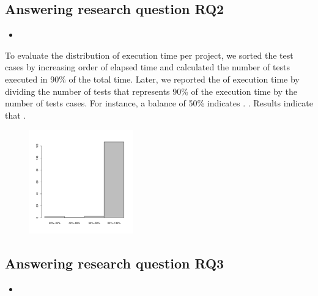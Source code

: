 \subsection{Answering research question RQ2}
\label{sec:rqTwo}

\begin{itemize}
    \item \RQC
\end{itemize}

To evaluate the distribution of execution time per project, we sorted
the test cases by increasing order of elapsed time and calculated the
number of tests executed in 90\% of the total time. Later, we reported
the  of execution time by dividing the number of tests
that represents 90\% of the execution time by the number of tests
cases. For instance, a balance of 50\% indicates .  . Results
indicate that .

\begin{figure}[h!]
    \centering
    \includegraphics[width=0.4\textwidth]{figs/tcdistrib.pdf}
    \caption{}
\end{figure}

\subsection{Answering research question RQ3}
\label{sec:rqThree}

\begin{itemize}
    \item \RQB
\end{itemize}

